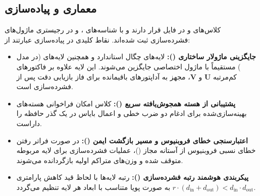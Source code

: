 \subsection{معماری و پیاده‌سازی}
کلاس‌های  و  در فایل  قرار دارند و با شناسه‌های ،  و  در رجیستری ماژول‌های فشرده‌سازی ثبت شده‌اند. نقاط کلیدی در پیاده‌سازی عبارتند از:
\begin{itemize}
    \item \textbf{جایگزینی ماژولار ساختاری ():} لایه‌های چگال استاندارد و همچنین لایه‌های  (در مدل ) مستقیماً با ماژول اختصاصی  جایگزین می‌شوند. این لایه علاوه بر فاکتورهای کم‌مرتبه $\mathbf{U}$ و $\mathbf{V}$، مجهز به آداپتورهای باقیمانده  برای فاز بازیابی دقت پس از فشرده‌سازی است.
    \item \textbf{پشتیبانی از هسته همجوش‌یافته سریع ():} کلاس  امکان فراخوانی هسته‌های بهینه‌سازی‌شده برای ادغام دو ضرب خطی و اعمال بایاس در یک گذر حافظه  را داراست.
    \item \textbf{اعتبارسنجی خطای فروبنیوس و مسیر بازگشت ایمن ():} در صورت فراتر رفتن خطای نسبی فروبنیوس از آستانه مجاز ()، عملیات فشرده‌سازی برای لایه مربوطه متوقف شده و وزن‌های متراکم اولیه بازگردانده می‌شوند.
    \item \textbf{پیکربندی هوشمند رتبه فشرده‌سازی ():} رتبه لایه‌ها با لحاظ قید کاهش پارامتری $r \cdot (d_{\text{in}} + d_{\text{out}}) < d_{\text{in}} \cdot d_{\text{out}}$ به صورت پویا متناسب با ابعاد هر لایه تنظیم می‌گردد.
\end{itemize}
